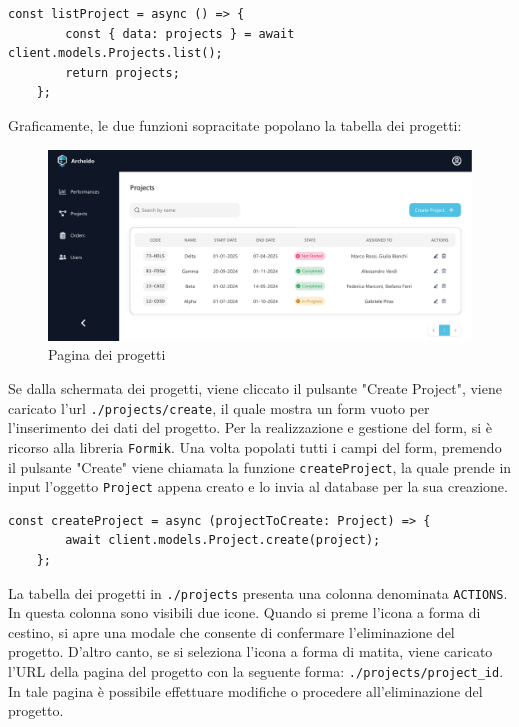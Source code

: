 \documentclass[target=bach,aauheader=,style=]{thud}
\begin{document}
\begin{lstlisting}[caption=funzione \texttt{listProject}]
    const listProject = async () => {
        const { data: projects } = await client.models.Projects.list();
        return projects;
    };
\end{lstlisting}
Graficamente, le due funzioni sopracitate popolano la tabella dei progetti:

\begin{figure}[h!]
    \centering
    \includegraphics[width=1\textwidth]{img/interfacce/table_project.pdf} 
    \caption{Pagina dei progetti}
\end{figure}
\noindent Se dalla schermata dei progetti, viene cliccato il pulsante "Create Project", viene caricato l'url \texttt{./projects/create}, il quale mostra un form vuoto per l'inserimento dei dati del progetto. Per la realizzazione e gestione del form, si è ricorso alla libreria \texttt{Formik}. Una volta popolati tutti i campi del form, premendo il pulsante "Create" viene chiamata la funzione \texttt{createProject}, la quale prende in input l'oggetto \texttt{Project} appena creato e lo invia al database per la sua creazione.

\begin{lstlisting}[caption=funzione \texttt{createProject}]
    const createProject = async (projectToCreate: Project) => {
        await client.models.Project.create(project);
    };
\end{lstlisting}

\noindent La tabella dei progetti in \texttt{./projects} presenta una colonna denominata \texttt{ACTIONS}. In questa colonna sono visibili due icone. Quando si preme l'icona a forma di cestino, si apre una modale che consente di confermare l'eliminazione del progetto. D'altro canto, se si seleziona l'icona a forma di matita, viene caricato l'URL della pagina del progetto con la seguente forma: \texttt{./projects/project\_id}. In tale pagina è possibile effettuare modifiche o procedere all'eliminazione del progetto.
\end{document}
